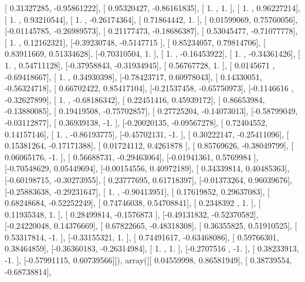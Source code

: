 \documentclass{article}
\begin{document}
       [ 0.31327285, -0.95861222],
       [ 0.95320427, -0.86161835],
       [ 1.        ,  1.        ],
       [ 1.        ,  0.96227214],
       [ 1.        ,  0.93210544],
       [ 1.        , -0.26174364],
       [ 0.71864442,  1.        ],
       [ 0.01599069,  0.75760056],
       [-0.01145785, -0.26989573],
       [ 0.21177473, -0.18686387],
       [ 0.53045477, -0.71077778],
       [ 1.        ,  0.12162321],
       [-0.39230748, -0.5147715 ],
       [ 0.85234057,  0.79814706],
       [ 0.83911669,  0.51334628],
       [-0.70310504,  1.        ],
       [ 1.        , -0.16453922],
       [ 1.        , -0.34361426],
       [ 1.        ,  0.54711128],
       [-0.37958843, -0.31934945],
       [ 0.56767728,  1.        ],
       [ 0.0145671 , -0.69418667],
       [ 1.        ,  0.34930398],
       [-0.78423717,  0.60978043],
       [ 0.14330051, -0.56324718],
       [ 0.66702422,  0.85417104],
       [-0.21537458, -0.65750973],
       [-0.1146616 , -0.32627899],
       [ 1.        , -0.68186342],
       [ 0.22451416,  0.45939172],
       [ 0.86653984, -0.13880085],
       [ 0.19419508, -0.75702857],
       [ 0.27725204, -0.14073013],
       [-0.58799049, -0.03112877],
       [ 0.36939138, -1.        ],
       [-0.20020135, -0.09567278],
       [ 0.72404552,  0.14157146],
       [ 1.        , -0.86193775],
       [-0.45702131, -1.        ],
       [ 0.30222147, -0.25411096],
       [ 0.15381264, -0.17171388],
       [ 0.01724112,  0.4261878 ],
       [ 0.85769626, -0.38049799],
       [ 0.06065176, -1.        ],
       [ 0.56688731, -0.29463064],
       [-0.01941361,  0.5769984 ],
       [-0.70548629,  0.05449694],
       [-0.00154556,  0.40972189],
       [ 0.34339814,  0.40485363],
       [-0.60198715, -0.30273955],
       [ 0.23777695,  0.61718397],
       [-0.01373264,  0.96039676],
       [-0.25883638, -0.29231647],
       [ 1.        , -0.90413951],
       [ 0.17619852,  0.29637083],
       [ 0.68248684, -0.52252249],
       [ 0.74746038,  0.54708841],
       [ 0.2348392 ,  1.        ],
       [ 0.11935348,  1.        ],
       [ 0.28499814, -0.1576873 ],
       [-0.49131832, -0.52370582],
       [-0.24220048,  0.14376669],
       [ 0.67822665, -0.48318308],
       [ 0.36355825,  0.51910525],
       [ 0.53317814, -1.        ],
       [-0.33155321,  1.        ],
       [ 0.74491617, -0.63468086],
       [ 0.59766301,  0.38464859],
       [-0.36360183, -0.26314984],
       [ 1.        ,  1.        ],
       [-0.2707516 , -1.        ],
       [ 0.38233913, -1.        ],
       [-0.57991115,  0.60739566]]), array([[ 0.04559998,  0.86581949],
       [ 0.38739554, -0.68738814],
\end{document}
